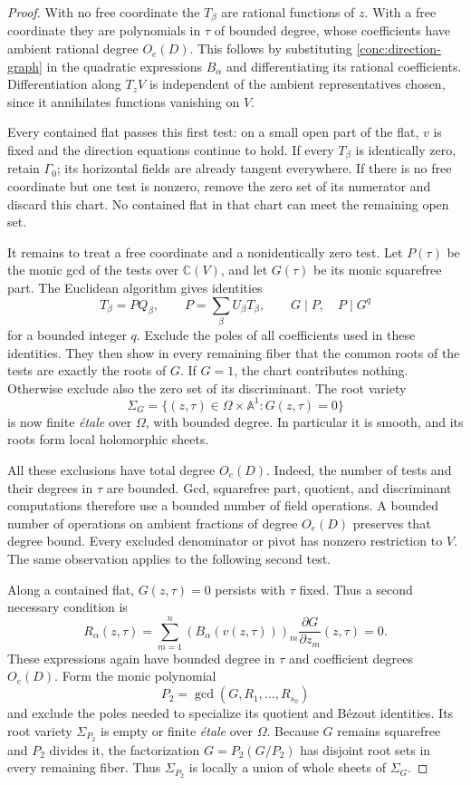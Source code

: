 \begin{proof}
With no free coordinate the $T_\beta$ are rational functions of $z$.
With a free coordinate they are polynomials in $\tau$ of bounded
degree, whose coefficients have ambient rational degree $O_e(D)$.
This follows by substituting \eqref{conc:direction-graph} in the
quadratic expressions $B_\alpha$ and differentiating its rational
coefficients.  Differentiation along $T_zV$ is independent of the
ambient representatives chosen, since it annihilates functions
vanishing on $V$.

Every contained flat passes this first test: on a small open part of
the flat, $v$ is fixed and the direction equations continue to hold.
If every $T_\beta$ is identically zero, retain $\Gamma_0$; its
horizontal fields are already tangent everywhere.  If there is no
free coordinate but one test is nonzero, remove the zero set of its
numerator and discard this chart.  No contained flat in that chart
can meet the remaining open set.

It remains to treat a free coordinate and a nonidentically zero test.
Let $P(\tau)$ be the monic gcd of the tests over $\mathbb C(V)$, and
let $G(\tau)$ be its monic squarefree part.  The Euclidean algorithm
gives identities
\[
 T_\beta=P Q_\beta,\qquad
 P=\sum_\beta U_\beta T_\beta,
 \qquad G\mid P,\quad P\mid G^q
\]
for a bounded integer $q$.  Exclude the poles of all coefficients
used in these identities.  They then show in every remaining fiber
that the common roots of the tests are exactly the roots of $G$.
If $G=1$, the chart contributes nothing.  Otherwise exclude also the
zero set of its discriminant.  The root variety
\[
 \Sigma_G=\{(z,\tau)\in\Omega\times\mathbb A^1:G(z,\tau)=0\}
\]
is now finite \emph{\'etale} over $\Omega$, with bounded degree.  In
particular it is smooth, and its roots form local holomorphic sheets.

All these exclusions have total degree $O_e(D)$.  Indeed, the number
of tests and their degrees in $\tau$ are bounded.  Gcd, squarefree
part, quotient, and discriminant computations therefore use a bounded
number of field operations.  A bounded number of operations on
ambient fractions of degree $O_e(D)$ preserves that degree bound.
Every excluded denominator or pivot has nonzero restriction to $V$.
The same observation applies to the following second test.

Along a contained flat, $G(z,\tau)=0$ persists with $\tau$ fixed.
Thus a second necessary condition is
\[
 R_\alpha(z,\tau)
 =\sum_{m=1}^{n}(B_\alpha(v(z,\tau)))_m
                  \frac{\partial G}{\partial z_m}(z,\tau)=0.
\]
These expressions again have bounded degree in $\tau$ and coefficient
degrees $O_e(D)$.  Form the monic polynomial
\[
 P_2=\gcd(G,R_1,\ldots,R_{s_0})
\]
and exclude the poles needed to specialize its quotient and B\'ezout
identities.  Its root variety $\Sigma_{P_2}$ is empty or finite
\emph{\'etale} over $\Omega$.  Because $G$ remains squarefree and
$P_2$ divides it, the factorization $G=P_2(G/P_2)$ has disjoint root
sets in every remaining fiber.  Thus $\Sigma_{P_2}$ is locally a union
of whole sheets of $\Sigma_G$.


\end{proof}
